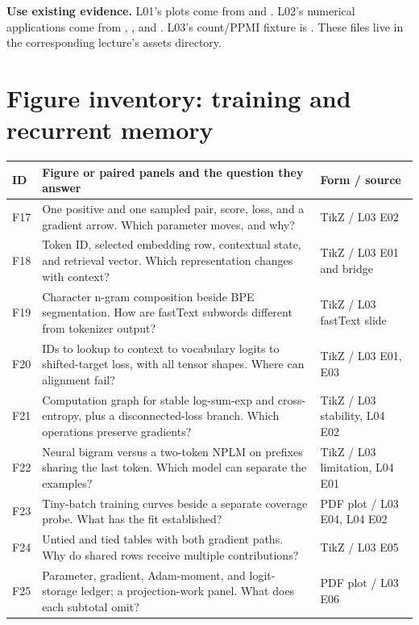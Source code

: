 \documentclass[11pt,a4paper]{article}
\begin{document}
\textbf{Use existing evidence.} L01's plots come from
 and .
L02's numerical applications come from ,
, and .
L03's count/PPMI fixture is .
These files live in the corresponding lecture's assets directory.

\clearpage
\section{Figure inventory: training and recurrent memory}
\begingroup
\small
\renewcommand{\arraystretch}{1.23}
\begin{tabularx}{\textwidth}{@{}p{8mm} Y >{\raggedright\arraybackslash}p{32mm}@{}}
\toprule
ID & Figure or paired panels and the question they answer & Form / source\\
\midrule
F17 & One positive and one sampled pair, score, loss, and a gradient arrow. Which parameter moves, and why? & TikZ / L03 E02\\
F18 & Token ID, selected embedding row, contextual state, and retrieval vector. Which representation changes with context? & TikZ / L03 E01 and bridge\\
F19 & Character n-gram composition beside BPE segmentation. How are fastText subwords different from tokenizer output? & TikZ / L03 fastText slide\\
F20 & IDs to lookup to context to vocabulary logits to shifted-target loss, with all tensor shapes. Where can alignment fail? & TikZ / L03 E01, E03\\
F21 & Computation graph for stable log-sum-exp and cross-entropy, plus a disconnected-loss branch. Which operations preserve gradients? & TikZ / L03 stability, L04 E02\\
F22 & Neural bigram versus a two-token NPLM on prefixes sharing the last token. Which model can separate the examples? & TikZ / L03 limitation, L04 E01\\
F23 & Tiny-batch training curves beside a separate coverage probe. What has the fit established? & PDF plot / L03 E04, L04 E02\\
F24 & Untied and tied tables with both gradient paths. Why do shared rows receive multiple contributions? & TikZ / L03 E05\\
F25 & Parameter, gradient, Adam-moment, and logit-storage ledger; a projection-work panel. What does each subtotal omit? & PDF plot / L03 E06\\

\end{tabularx}
\end{document}
